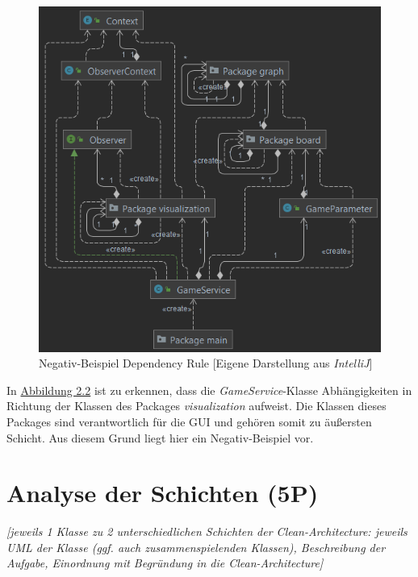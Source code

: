 \begin{figure}[htbp]
\centering
\centerline{\includegraphics[scale=.5]{dependencyrule_klasse_gameservice}}
\caption{Negativ-Beispiel Dependency Rule [Eigene Darstellung aus \emph{IntelliJ}]}
\label{fig:dependencyrulenegativ}
\end{figure}

\noindent In \hyperref[fig:dependencyrulepositiv]{Abbildung 2.2} ist zu erkennen, dass die \emph{GameService}-Klasse Abhängigkeiten in Richtung der Klassen des Packages \emph{visualization} aufweist. Die Klassen dieses Packages sind verantwortlich für die \acs{GUI} und gehören somit zu äußersten Schicht. Aus diesem Grund liegt hier ein Negativ-Beispiel vor.

\newpage

\section{Analyse der Schichten (5P)}
\emph{[jeweils 1 Klasse zu 2 unterschiedlichen Schichten der Clean-Architecture: jeweils UML der Klasse
(ggf. auch zusammenspielenden Klassen), Beschreibung der Aufgabe, Einordnung mit Begründung in
die Clean-Architecture]}

